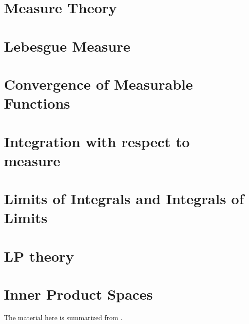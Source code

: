 \newpage 





\section{Measure Theory}
\label{sec:Measure Theory}
\section{Lebesgue Measure}
\label{sec:Lebesgue Measure}
\section{Convergence of Measurable Functions}
\label{sec:Convergence of Measurable Functions}
\section{Integration with respect to measure}
\label{sec:Integration with respect to measure}
\section{Limits of Integrals and Integrals of Limits}
\label{sec:Limits of Integrals and Integrals of Limits}
\section{LP theory}
\label{sec:LP theory}
\section{Inner Product Spaces}
\label{sec:Inner Product Spaces}
The material here is summarized from \cite{firstcourse_wfa}. 
